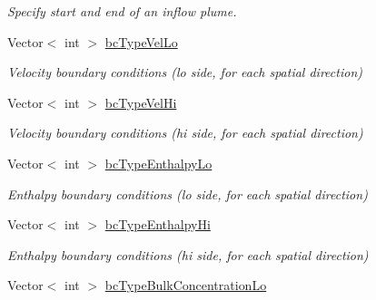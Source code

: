 \begin{DoxyCompactItemize}
\begin{DoxyCompactList}\small\item\em Specify start and end of an inflow plume. \end{DoxyCompactList}\item 
\hypertarget{class_mushy_layer_params_ab4202e8c981298a3723c865fefd5595b}{Vector$<$ int $>$ \hyperlink{class_mushy_layer_params_ab4202e8c981298a3723c865fefd5595b}{bc\-Type\-Vel\-Lo}}\label{class_mushy_layer_params_ab4202e8c981298a3723c865fefd5595b}

\begin{DoxyCompactList}\small\item\em Velocity boundary conditions (lo side, for each spatial direction) \end{DoxyCompactList}\item 
\hypertarget{class_mushy_layer_params_adb891e3de531ee991361b91b7d8aa528}{Vector$<$ int $>$ \hyperlink{class_mushy_layer_params_adb891e3de531ee991361b91b7d8aa528}{bc\-Type\-Vel\-Hi}}\label{class_mushy_layer_params_adb891e3de531ee991361b91b7d8aa528}

\begin{DoxyCompactList}\small\item\em Velocity boundary conditions (hi side, for each spatial direction) \end{DoxyCompactList}\item 
\hypertarget{class_mushy_layer_params_ac308a0d191cc626bf2df54e3a3a9fdca}{Vector$<$ int $>$ \hyperlink{class_mushy_layer_params_ac308a0d191cc626bf2df54e3a3a9fdca}{bc\-Type\-Enthalpy\-Lo}}\label{class_mushy_layer_params_ac308a0d191cc626bf2df54e3a3a9fdca}

\begin{DoxyCompactList}\small\item\em Enthalpy boundary conditions (lo side, for each spatial direction) \end{DoxyCompactList}\item 
\hypertarget{class_mushy_layer_params_ae81f844a9bb7d53ca363b255942d1f87}{Vector$<$ int $>$ \hyperlink{class_mushy_layer_params_ae81f844a9bb7d53ca363b255942d1f87}{bc\-Type\-Enthalpy\-Hi}}\label{class_mushy_layer_params_ae81f844a9bb7d53ca363b255942d1f87}

\begin{DoxyCompactList}\small\item\em Enthalpy boundary conditions (hi side, for each spatial direction) \end{DoxyCompactList}\item 
\hypertarget{class_mushy_layer_params_a255ae9ca43a9de9d1cd160504d7d8050}{Vector$<$ int $>$ \hyperlink{class_mushy_layer_params_a255ae9ca43a9de9d1cd160504d7d8050}{bc\-Type\-Bulk\-Concentration\-Lo}}\label{class_mushy_layer_params_a255ae9ca43a9de9d1cd160504d7d8050}


\end{DoxyCompactItemize}
